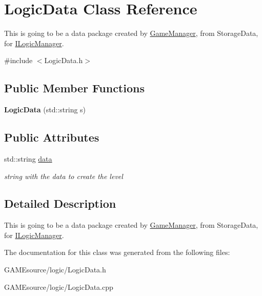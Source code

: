 \hypertarget{class_logic_data}{}\section{Logic\+Data Class Reference}
\label{class_logic_data}


This is going to be a data package created by \mbox{\hyperlink{class_game_manager}{Game\+Manager}}, from Storage\+Data, for \mbox{\hyperlink{class_i_logic_manager}{I\+Logic\+Manager}}.  




{\ttfamily \#include $<$Logic\+Data.\+h$>$}

\subsection*{Public Member Functions}
\begin{DoxyCompactItemize}
\item 
\mbox{\label{class_logic_data_a182f7a8ffcbb3401e55e2922753c17bb}} 
{\bfseries Logic\+Data} (std\+::string s)
\end{DoxyCompactItemize}
\subsection*{Public Attributes}
\begin{DoxyCompactItemize}
\item 
\mbox{\label{class_logic_data_a59c1bf0acf3ec2ea31d3bbf814740f2e}} 
std\+::string \mbox{\hyperlink{class_logic_data_a59c1bf0acf3ec2ea31d3bbf814740f2e}{data}}
\begin{DoxyCompactList}\small\item\em string with the data to create the level \end{DoxyCompactList}\end{DoxyCompactItemize}


\subsection{Detailed Description}
This is going to be a data package created by \mbox{\hyperlink{class_game_manager}{Game\+Manager}}, from Storage\+Data, for \mbox{\hyperlink{class_i_logic_manager}{I\+Logic\+Manager}}. 

The documentation for this class was generated from the following files\+:\begin{DoxyCompactItemize}
\item 
G\+A\+M\+Esource/logic/Logic\+Data.\+h\item 
G\+A\+M\+Esource/logic/Logic\+Data.\+cpp\end{DoxyCompactItemize}
